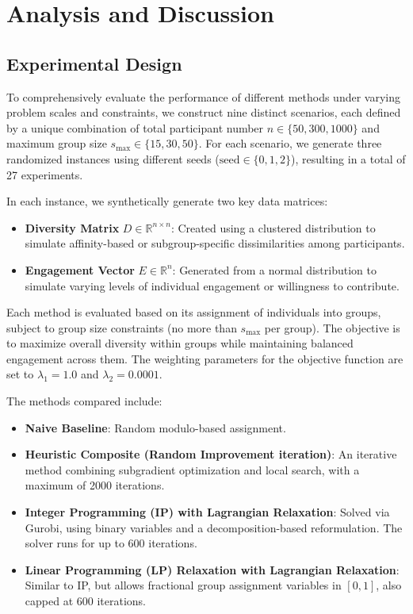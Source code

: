 \section{Analysis and Discussion}

\subsection{Experimental Design}

To comprehensively evaluate the performance of different methods under varying problem scales and constraints, we construct nine distinct scenarios, each defined by a unique combination of total participant number $n \in \{50, 300, 1000\}$ and maximum group size $s_{\max} \in \{15, 30, 50\}$. For each scenario, we generate three randomized instances using different seeds ($\text{seed} \in \{0, 1, 2\}$), resulting in a total of 27 experiments.

In each instance, we synthetically generate two key data matrices:
\begin{itemize}
    \item \textbf{Diversity Matrix} $D \in \mathbb{R}^{n \times n}$: Created using a clustered distribution to simulate affinity-based or subgroup-specific dissimilarities among participants.
    \item \textbf{Engagement Vector} $E \in \mathbb{R}^n$: Generated from a normal distribution to simulate varying levels of individual engagement or willingness to contribute.
\end{itemize}

Each method is evaluated based on its assignment of individuals into groups, subject to group size constraints (no more than $s_{\max}$ per group). The objective is to maximize overall diversity within groups while maintaining balanced engagement across them. The weighting parameters for the objective function are set to $\lambda_1 = 1.0$ and $\lambda_2 = 0.0001$.

The methods compared include:
\begin{itemize}
    \item \textbf{Naive Baseline}: Random modulo-based assignment.
    \item \textbf{Heuristic Composite (Random Improvement iteration)}: An iterative method combining subgradient optimization and local search, with a maximum of 2000 iterations.
    \item \textbf{Integer Programming (IP) with Lagrangian Relaxation}: Solved via Gurobi, using binary variables and a decomposition-based reformulation. The solver runs for up to 600 iterations.
    \item \textbf{Linear Programming (LP) Relaxation with Lagrangian Relaxation}: Similar to IP, but allows fractional group assignment variables in $[0, 1]$, also capped at 600 iterations.
\end{itemize}

